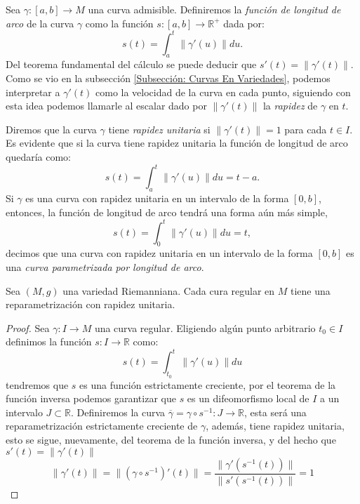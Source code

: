 \begin{definition}
	Sea $\gamma: [a,b] \to M$ una curva admisible. Definiremos la \textit{función de longitud de arco} de la curva $\gamma$ como la función $s: [a,b] \to \mathbb{R}^{+}$ dada por:
	\[
		s(t) = \int_{a}^{t} \|\gamma'(u) \| du.
	\]
	Del teorema fundamental del cálculo se puede deducir que $s'(t) = \| \gamma'(t) \|$. Como se vio en la subsección \ref{Subsección: Curvas En Variedades}, podemos interpretar a $\gamma'(t)$ como la velocidad de la curva en cada punto, siguiendo con esta idea podemos llamarle al escalar dado por $\|\gamma'(t)\|$ la \textit{rapidez} de $\gamma$ en $t$.

	Diremos que la curva $\gamma$ tiene \textit{rapidez unitaria} si $\|\gamma'(t)\| = 1$ para cada $t \in I$. Es evidente que si la curva tiene rapidez unitaria la función de longitud de arco quedaría como:
	\[
		s(t) = \int_{a}^{t} \|\gamma'(u)\|du = t - a.
	\]
	Si $\gamma$ es una curva con rapidez unitaria en un intervalo de la forma $[0,b]$, entonces, la función de longitud de arco tendrá una forma aún más simple,
	\[
		s(t) = \int_{0}^{t} \|\gamma'(u)\| du = t,
	\]
	decimos que una curva con rapidez unitaria en un intervalo de la forma $[0,b]$ es una \textit{curva parametrizada por longitud de arco}.
\end{definition}

\begin{lemma}
	Sea $(M,g)$ una variedad Riemanniana. Cada cura regular en $M$ tiene una reparametrización con rapidez unitaria.
\end{lemma}

\begin{proof}
	Sea $\gamma: I \to M$ una curva regular. Eligiendo algún punto arbitrario $t_0 \in I$ definimos la función $s: I \to \mathbb{R}$ como:
	\[
		s(t) = \int_{t_0}^{t} \|\gamma'(u)\|du
	\]
	tendremos que $s$ es una función estrictamente creciente, por el teorema de la función inversa podemos garantizar que $s$ es un difeomorfismo local de $I$ a un intervalo $J \subset \mathbb{R}$. Definiremos la curva $\overline{\gamma} = \gamma \circ s^{-1}: J \to \mathbb{R}$, esta será una reparametrización estrictamente creciente de $\gamma$, además, tiene rapidez unitaria, esto se sigue, nuevamente, del teorema de la función inversa, y del hecho que $s'(t) = \|\gamma'(t)\|$
	\[
		\|\gamma'(t)\| = \|(\gamma \circ s^{-1})'(t)\| = \frac{ \|\gamma'(s^{-1}(t))\| }{\| s'(s^{-1}(t))\| } = 1
	\]
\end{proof}

